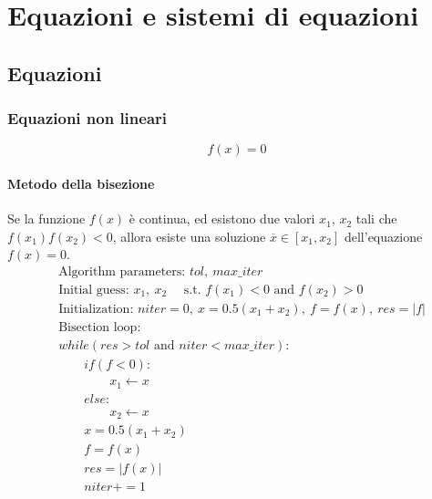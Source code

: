 
\chapter{Equazioni e sistemi di equazioni}
\section{Equazioni}
\subsection{Equazioni non lineari}
\begin{equation}
  f(x) = 0
\end{equation}
\subsubsection{Metodo della bisezione}
Se la funzione $f(x)$ è continua, ed esistono due valori $x_1$, $x_2$ tali che $f(x_1)f(x_2) < 0$, allora esiste una soluzione $\overline{x} \in [x_1, x_2]$ dell'equazione $f(x) = 0$.
\begin{equation}
\begin{aligned}
& \text{Algorithm parameters: } tol, \ max\_iter \\
& \text{Initial guess: } x_1, \ x_2 \quad \text{ s.t. $f(x_1) < 0$ and $f(x_2) > 0$} \\
& \text{Initialization: } niter = 0, \ x = 0.5(x_1 + x_2), \ f = f(x), \ res = |f| \\
& \text{Bisection loop: } \\
& while ( res > tol \text{ and } niter < max\_iter ): \\ 
& \qquad if ( f < 0 ): \\
& \qquad \qquad x_1 \leftarrow x \\
& \qquad else: \\
& \qquad \qquad x_2 \leftarrow x  \\
& \qquad x = 0.5(x_1+x_2) \\
& \qquad f = f(x) \\
& \qquad res = |f(x)| \\
& \qquad niter += 1
\end{aligned}
\end{equation}


